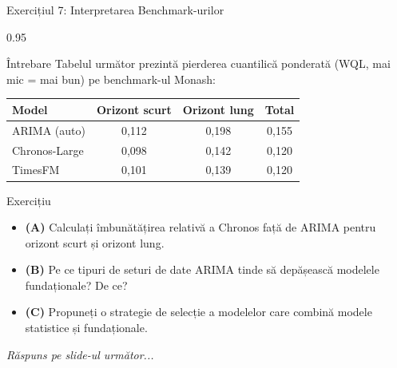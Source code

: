 \documentclass[9pt, aspectratio=169, t]{beamer}
\begin{document}
\begin{frame}{Exercițiul 7: Interpretarea Benchmark-urilor}
    \begin{cminipage}{0.95\textwidth}
    {\small
    \begin{alertblock}{Întrebare}
        Tabelul următor prezintă pierderea cuantilică ponderată (WQL, mai mic = mai bun) pe benchmark-ul Monash:
        \begin{center}
        {\footnotesize
        \begin{tabular}{lccc}
            \toprule
            \textbf{Model} & \textbf{Orizont scurt} & \textbf{Orizont lung} & \textbf{Total} \\
            \midrule
            ARIMA (auto) & 0,112 & 0,198 & 0,155 \\
            Chronos-Large & 0,098 & 0,142 & 0,120 \\
            TimesFM & 0,101 & 0,139 & 0,120 \\
            \bottomrule
        \end{tabular}
        }
        \end{center}
    \end{alertblock}

    \vspace{0.1cm}

    \begin{block}{Exercițiu}
        \begin{itemize}\setlength{\itemsep}{3pt}
            \item \textcolor{MainBlue}{\textbf{(A)}} Calculați îmbunătățirea relativă a Chronos față de ARIMA pentru orizont scurt și orizont lung.
            \item \textcolor{MainBlue}{\textbf{(B)}} Pe ce tipuri de seturi de date ARIMA tinde să depășească modelele fundaționale? De ce?
            \item \textcolor{MainBlue}{\textbf{(C)}} Propuneți o strategie de selecție a modelelor care combină modele statistice și fundaționale.
        \end{itemize}
    \end{block}

    \vspace{0.1cm}

    \begin{center}
        \textit{Răspuns pe slide-ul următor...}
    \end{center}
    }
    \end{cminipage}
\end{frame}
\end{document}
